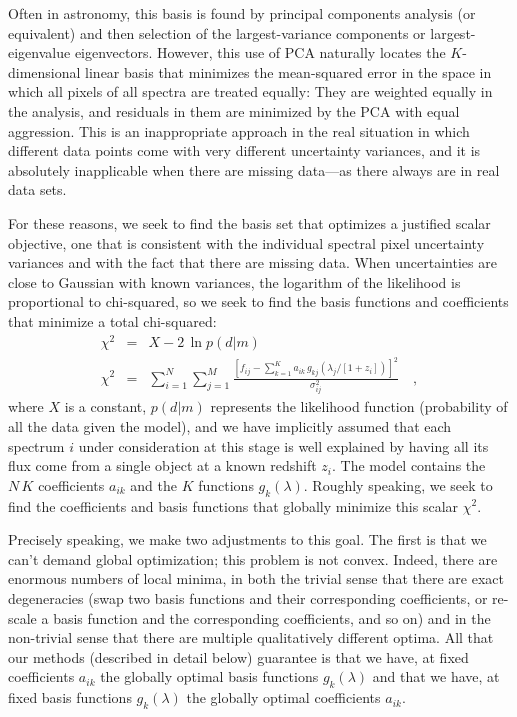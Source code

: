 \documentclass[12pt,preprint]{aastex}
\begin{document}
Often in astronomy, this basis is found by principal components
analysis (or equivalent) and then selection of the largest-variance
components or largest-eigenvalue eigenvectors.  However, this use of
PCA naturally locates the $K$-dimensional linear basis that minimizes
the mean-squared error in the space in which all pixels of all spectra
are treated equally: They are weighted equally in the analysis, and
residuals in them are minimized by the PCA with equal aggression. This
is an inappropriate approach in the real situation in which different
data points come with very different uncertainty variances, and it is
absolutely inapplicable when there are missing data---as there always
are in real data sets.

For these reasons, we seek to find the basis set that optimizes a
justified scalar objective, one that is consistent with the individual
spectral pixel uncertainty variances and with the fact that there are
missing data.  When uncertainties are close to Gaussian with known
variances, the logarithm of the likelihood is proportional to
chi-squared, so we seek to find the basis functions and coefficients
that minimize a total chi-squared:
\begin{eqnarray}\label{chi-squared}\displaystyle
\chi^2 & = & X - 2\,\ln p(d|m) \nonumber\\
\chi^2 & = & \sum_{i=1}^N \sum_{j=1}^M
             \frac{\left[f_{ij}-\sum_{k=1}^K a_{ik}
                      \,g_{kj}(\lambda_j/[1+z_i])\right]^2}
{\sigma^2_{ij}}
\quad ,
\end{eqnarray}
where $X$ is a constant, $p(d|m)$ represents the likelihood function
(probability of all the data given the model), and we have implicitly
assumed that each spectrum $i$ under consideration at this stage is
well explained by having all its flux come from a single object at a
known redshift $z_i$. The model contains the $N\,K$ coefficients
$a_{ik}$ and the $K$ functions $g_k(\lambda)$. Roughly speaking, we
seek to find the coefficients and basis functions that globally
minimize this scalar $\chi^2$.

Precisely speaking, we make two adjustments to this goal. The first is
that we can't demand global optimization; this problem is not convex.
Indeed, there are enormous numbers of local minima, in both the
trivial sense that there are exact degeneracies (swap two basis
functions and their corresponding coefficients, or re-scale a basis
function and the corresponding coefficients, and so on) and in the
non-trivial sense that there are multiple qualitatively different
optima. All that our methods (described in detail below) guarantee is
that we have, at fixed coefficients $a_{ik}$ the globally optimal
basis functions $g_k(\lambda)$ and that we have, at fixed basis
functions $g_k(\lambda)$ the globally optimal coefficients $a_{ik}$.
\end{document}
